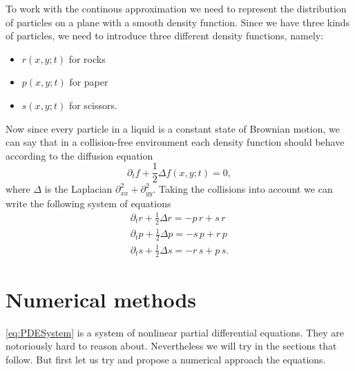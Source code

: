 \documentclass[a4paper, 11pt]{article}
\begin{document}
To work with the continous approximation we need to represent the distribution of particles on a plane with a smooth density function. Since we have three kinds of particles, we need to introduce three different density functions, namely:
\begin{itemize}
    \item{$r(x, y; t)$ for rocks}
    \item{$p(x, y; t)$ for paper}
    \item{$s(x, y; t)$ for scissors.}
\end{itemize}
Now since every particle in a liquid is a constant state of Brownian motion, we can say that in a collision-free environment each density function should behave according to the diffusion equation
\begin{equation*}
    \partial_{t} f + \frac{1}{2} \Delta f(x, y; t) = 0,
\end{equation*}
where $\Delta$ is the Laplacian $\partial^2_{xx} + \partial^{2}_{yy}$. Taking the collisions into account we can write the following system of equations
\begin{subequations}
    \label{eq:PDESystem}
    \begin{align}
        \partial_{t} r + \frac{1}{2} \Delta r = - p \, r + s \, r \\
        \partial_{t} p + \frac{1}{2} \Delta p = - s \, p + r \, p \\
        \partial_{t} s + \frac{1}{2} \Delta s = - r \, s + p \, s.
    \end{align}
\end{subequations}

\section{Numerical methods}

\eqref{eq:PDESystem} is a system of nonlinear partial differential equations. They are notoriously hard to reason about. Nevertheless we will try in the sections that follow. But first let us try and propose a numerical approach the equations.
\end{document}
